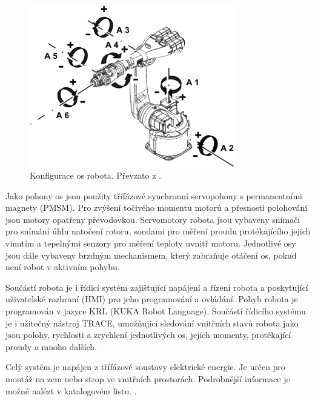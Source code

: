 \begin{figure}[ht]
\includegraphics[width=0.8\textwidth]{kuka_kr5_axes}
\caption{Konfigurace os robota. Převzato z \cite{kuka_datasheet_url}.}
\label{kuka_kr5_axes_pic}
\end{figure}

Jako pohony os jsou použity třífázové synchronní servopohony s permanentními magnety (PMSM). Pro zvýšení točivého momentu motorů a přesnosti polohování jsou motory opatřeny převodovkou. Servomotory robota jsou vybaveny snímači pro snímání úhlu natočení rotoru, sondami pro měření proudu protékajícího jejich vinutím a tepelnými senzory pro měření teploty uvnitř motoru. Jednotlivé osy jsou dále vybaveny brzdným mechanismem, který zabraňuje otáčení os, pokud není robot v aktivním pohybu. 

Součástí robota je i řídicí systém zajišťující napájení a řízení robota a poskytující uživatelské rozhraní (HMI) pro jeho programování a ovládání. Pohyb robota je programován v jazyce KRL (KUKA Robot Language). Součástí řídicího systému je i užitečný nástroj TRACE, umožňující sledování vnitřních stavů robota jako jsou polohy, rychlosti a zrychlení jednotlivých os, jejich momenty, protékající proudy a mnoho dalších. 

Celý systém je napájen z třífázové soustavy elektrické energie. Je určen pro montáž na zem nebo strop ve vnitřních prostorách. Podrobnější informace je možné nalézt v katalogovém listu. \cite{kuka_datasheet_url}.